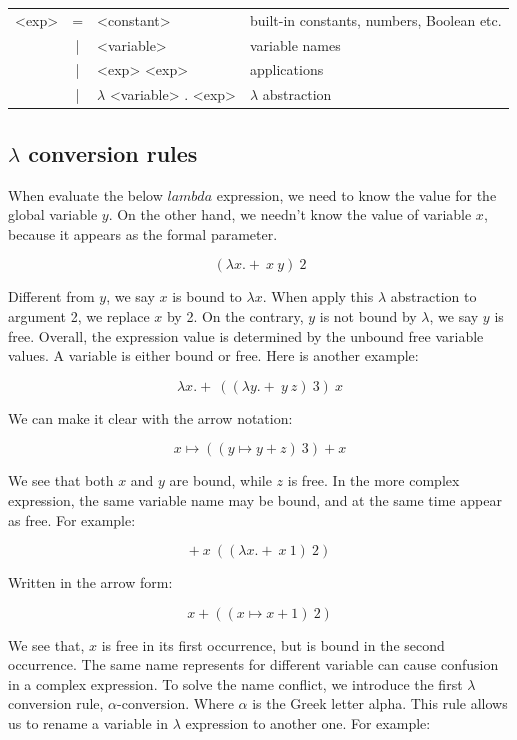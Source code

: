 \documentclass{article}
\begin{document}
\begin{tabular}{rcll}
<exp> & = & <constant> & built-in constants, numbers, Boolean etc. \\
        & | & <variable> & variable names \\
        & | & <exp> <exp> & applications \\
        & | & $\lambda$ <variable> . <exp> & $\lambda$ abstraction
\end{tabular}

\subsection{$\lambda$ conversion rules}

When evaluate the below $lambda$ expression, we need to know the value for the global variable $y$. On the other hand, we needn't know the value of variable $x$, because it appears as the formal parameter.

\[
(\lambda x . +\ x\ y)\ 2
\]

Different from $y$, we say $x$ is bound to $\lambda x$. When apply this $\lambda$ abstraction to argument 2, we replace $x$ by 2. On the contrary, $y$ is not bound by $\lambda$, we say $y$ is free. Overall, the expression value is determined by the unbound free variable values. A variable is either bound or free. Here is another example:

\[
\lambda x . +\ ((\lambda y . +\ y\ z)\ 3)\ x
\]

We can make it clear with the arrow notation:

\[
x \mapsto ((y \mapsto y + z)\ 3) + x
\]

We see that both $x$ and $y$ are bound, while $z$ is free. In the more complex expression, the same variable name may be bound, and at the same time appear as free. For example:

\[
+\ x\ ((\lambda x . +\ x\ 1)\ 2)
\]

Written in the arrow form:

\[
x + ((x \mapsto x + 1)\ 2)
\]

We see that, $x$ is free in its first occurrence, but is bound in the second occurrence. The same name represents for different variable can cause confusion in a complex expression. To solve the name conflict, we introduce the first $\lambda$ conversion rule, $\alpha$-conversion. Where $\alpha$ is the Greek letter alpha. This rule allows us to rename a variable in $\lambda$ expression to another one. For example:
\end{document}
